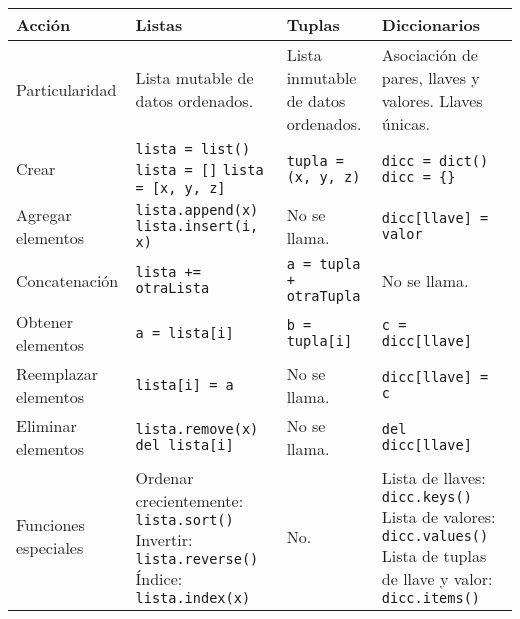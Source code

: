 \begin{center}
	\begin{tabular}{|A{2.5cm}|S{4.2cm}|S{4cm}|S{4.4cm}|}
	\hline
	Acción & Listas & Tuplas & Diccionarios \\
	\hline
	Particularidad & Lista mutable de datos ordenados. & Lista inmutable de datos ordenados. & Asociación de pares, llaves y valores. \newline Llaves únicas. \\
	\hline
	Crear & \texttt{lista = list()} \newline \texttt{lista = []} \newline \texttt{lista = [x, y, z]} & \texttt{tupla = (x, y, z)} & \texttt{dicc = dict()} \newline \texttt{dicc = \{\}} \\
	\hline
	Agregar elementos & \texttt{lista.append(x)} \newline \texttt{lista.insert(i, x)} & No se llama. & \texttt{dicc[llave] = valor} \\
	\hline
	Concatenación & \texttt{lista += otraLista} & \texttt{a = tupla + otraTupla} & No se llama. \\
	\hline
	Obtener elementos & \texttt{a = lista[i]} & \texttt{b = tupla[i]} & \texttt{c = dicc[llave]} \\
	\hline
	Reemplazar elementos & \texttt{lista[i] = a} & No se llama. & \texttt{dicc[llave] = c} \\
	\hline
	Eliminar elementos & \texttt{lista.remove(x)} \newline \texttt{del lista[i]} & No se llama. & \texttt{del dicc[llave]} \\
	\hline
	Funciones especiales & Ordenar crecientemente: \texttt{lista.sort()} \newline Invertir: \texttt{lista.reverse()} \newline Índice: \texttt{lista.index(x)} & No. & Lista de llaves: \texttt{dicc.keys()} \newline Lista de valores: \texttt{dicc.values()} \newline Lista de tuplas de llave y valor: \texttt{dicc.items()} \\
	\hline
	\end{tabular}
\end{center}
